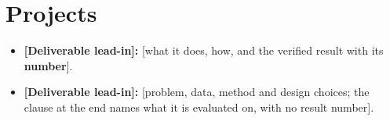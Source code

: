 \section*{Projects}
\vspace{-1.5pt}
\begin{itemize}
\item \textbf{[Deliverable lead-in]:} [what it does, how, and the verified result with its \textbf{number}].
\end{itemize}
\begin{itemize}
\item \textbf{[Deliverable lead-in]:} [problem, data, method and design choices; the clause at the end names what it is evaluated on, with no result number].
\end{itemize}

